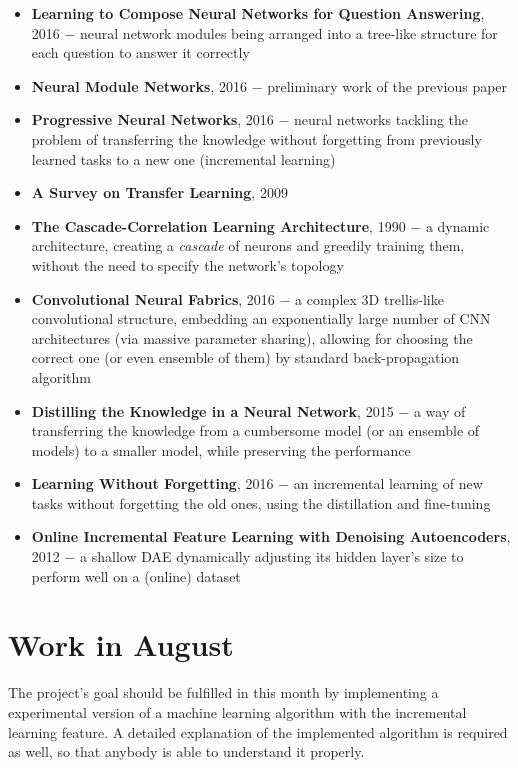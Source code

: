 \documentclass[a4paper]{article}
\begin{document}
\begin{itemize}
    \item \textbf{Learning to Compose Neural Networks for Question Answering},
        2016 $-$ neural network modules being arranged into a tree-like
        structure for each question to answer it correctly
    \item \textbf{Neural Module Networks}, 2016 $-$ preliminary work of the
        previous paper
    \item \textbf{Progressive Neural Networks}, 2016 $-$ neural networks
        tackling the problem of transferring the knowledge without forgetting
        from previously learned tasks to a new one (incremental learning)
    \item \textbf{A Survey on Transfer Learning}, 2009
    \item \textbf{The Cascade-Correlation Learning Architecture}, 1990
        $-$ a dynamic architecture, creating a \textit{cascade} of neurons and
        greedily training them, without the need to specify the network's
        topology
    \item \textbf{Convolutional Neural Fabrics}, 2016 $-$ a complex 3D
        trellis-like convolutional structure, embedding an exponentially large
        number of CNN architectures (via massive parameter sharing), allowing
        for choosing the correct one (or even ensemble of them) by standard
        back-propagation algorithm
    \item \textbf{Distilling the Knowledge in a Neural Network}, 2015 $-$ a way
        of transferring the knowledge from a cumbersome model (or an ensemble of
        models) to a smaller model, while preserving the performance
    \item \textbf{Learning Without Forgetting}, 2016 $-$ an incremental learning
        of new tasks without forgetting the old ones, using the distillation and
        fine-tuning
    \item \textbf{Online Incremental Feature Learning with Denoising Autoencoders},
        2012 $-$ a shallow DAE dynamically adjusting its hidden layer's size
        to perform well on a (online) dataset
\end{itemize}

\section{Work in August}
The project's goal should be fulfilled in this month by implementing a
experimental version of a machine learning algorithm with the incremental
learning feature. A detailed explanation of the implemented algorithm is required
as well, so that anybody is able to understand it properly.
\end{document}
